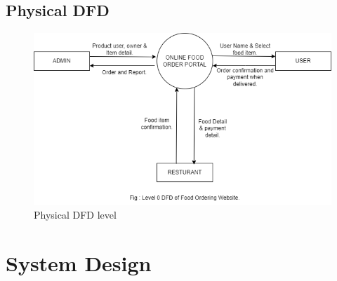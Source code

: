 \newpage
\subsection{Physical DFD}
\begin{figure}[h]
    \includegraphics[scale=0.6]{img/Graphics/Level DFD.png}
    \caption{Physical DFD level}
\end{figure}

\newpage

\section{System Design}
